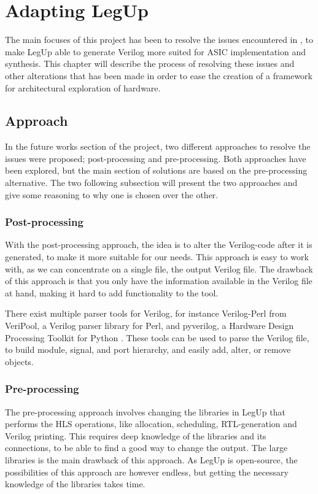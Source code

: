 \chapter{\label{chp:adaptinglegup}Adapting LegUp}
The main focuses of this project has been to resolve the issues encountered in \cite{holm2015pro}, to make LegUp able to generate Verilog more suited for ASIC implementation and synthesis. This chapter will describe the process of resolving these issues and other alterations that has been made in order to ease the creation of a framework for architectural exploration of hardware.
\section{Approach}
In the future works section of the project, two different approaches to resolve the issues were proposed; post-processing and pre-processing. Both approaches have been explored, but the main section of solutions are based on the pre-processing alternative. The two following subsection will present the two approaches and give some reasoning to why one is chosen over the other.
\subsection{Post-processing}
With the post-processing approach, the idea is to alter the Verilog-code after it is generated, to make it more suitable for our needs. This approach is easy to work with, as we can concentrate on a single file, the output Verilog file. The drawback of this approach is that you only have the information available in the Verilog file at hand, making it hard to add functionality to the tool.

There exist multiple parser tools for Verilog, for instance Verilog-Perl from VeriPool, a Verilog parser library for Perl, and pyverilog, a Hardware Design Processing Toolkit for Python \cite{Takamaeda2015Pyverilog}. These tools can be used to parse the Verilog file, to build module, signal, and port hierarchy, and easily add, alter, or remove objects.
\subsection{Pre-processing}
The pre-processing approach involves changing the libraries in LegUp that performs the HLS operations, like allocation, scheduling, RTL-generation and Verilog printing. This requires deep knowledge of the libraries and its connections, to be able to find a good way to change the output. The large libraries is the main drawback of this approach. As LegUp is open-source, the possibilities of this approach are however endless, but getting the necessary knowledge of the libraries takes time.
